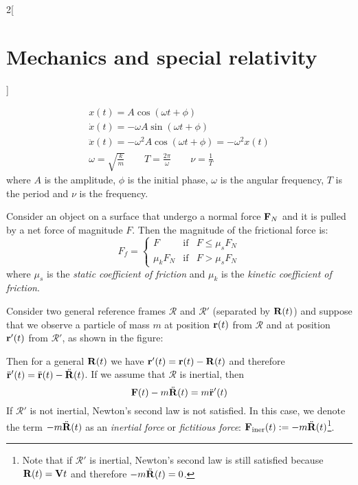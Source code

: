 \documentclass[../../../main.tex]{subfiles}
\begin{document}
\begin{multicols}{2}[\section{Mechanics and special relativity}]
\begin{prop}
        \begin{gather*}
            x(t)=A\cos(\omega t+\phi)\\
            \dot{x}(t)=-\omega A\sin(\omega t+\phi)\\
            \ddot{x}(t)=-\omega^2 A\cos(\omega t+\phi)=-\omega^2x(t)\\
            \omega=\sqrt{\frac{k}{m}}\qquad T=\frac{2\pi}{\omega}\qquad\nu=\frac{1}{T}
        \end{gather*}
        where $A$ is the amplitude, $\phi$ is the initial phase, $\omega$ is the angular frequency, $T$ is the period and $\nu$ is the frequency.
    \end{prop}
    \begin{prop}
        Consider an object on a surface that undergo a normal force $\boldsymbol{\mathrm{F}}_N$ and it is pulled by a net force of magnitude $F$. Then the magnitude of the frictional force is:
        $$
            F_f=\left\{
            \begin{array}{rcl}
                F        & \text{if} & F\leq\mu_sF_N \\
                \mu_kF_N & \text{if} & F>\mu_sF_N
            \end{array}\right.
        $$
        where $\mu_s$ is the \textit{static coefficient of friction} and $\mu_k$ is the \textit{kinetic coefficient of friction}.
    \end{prop}
    \begin{prop}
        Consider two general reference frames $\mathcal{R}$ and $\mathcal{R}'$ (separated by $\boldsymbol{\mathrm{R}}(t)$) and suppose that we observe a particle of mass $m$ at position $\boldsymbol{\mathrm{r}}(t)$ from $\mathcal{R}$ and at position $\boldsymbol{\mathrm{r}}'(t)$ from $\mathcal{R}'$, as shown in the figure:
        \begin{center}
            \begin{minipage}{\linewidth}
                \centering
                
            \end{minipage}
        \end{center}
        Then for a general $\boldsymbol{\mathrm{R}}(t)$ we have $\boldsymbol{\mathrm{r}}'(t)=\boldsymbol{\mathrm{r}}(t)-\boldsymbol{\mathrm{R}}(t)$ and therefore $\ddot{\boldsymbol{\mathrm{r}}}'(t)=\ddot{\boldsymbol{\mathrm{r}}}(t)-\ddot{\boldsymbol{\mathrm{R}}}(t)$. If we assume that $\mathcal{R}$ is inertial, then $$\boldsymbol{\mathrm{F}}(t)-m\ddot{\boldsymbol{\mathrm{R}}}(t)=m\ddot{\boldsymbol{\mathrm{r}}}'(t)$$ If $\mathcal{R}'$ is not inertial, Newton's second law is not satisfied. In this case, we denote the term $-m\ddot{\boldsymbol{\mathrm{R}}}(t)$ as an \textit{inertial force} or \textit{fictitious force}: $\boldsymbol{\mathrm{F}}_\text{iner}(t):=-m\ddot{\boldsymbol{\mathrm{R}}}(t)$\footnote{Note that if $\mathcal{R}'$ is inertial, Newton's second law is still satisfied because $\boldsymbol{\mathrm{R}}(t)=\boldsymbol{\mathrm{V}}t$ and therefore $-m\ddot{\boldsymbol{\mathrm{R}}}(t)=0$.}.

\end{prop}
\end{multicols}
\end{document}

